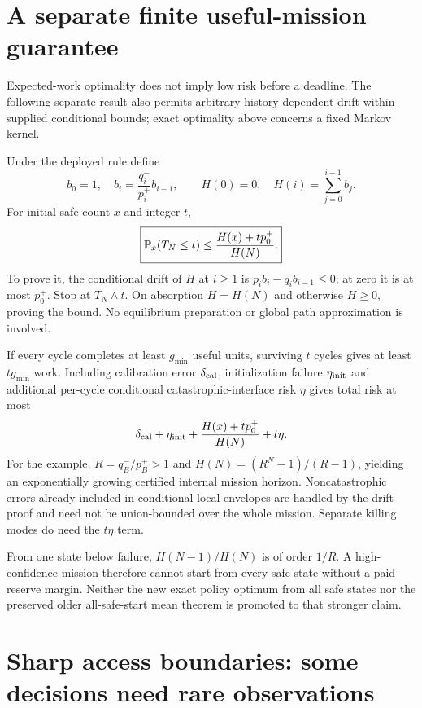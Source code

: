 \documentclass[10pt,a4paper]{article}
\begin{document}
\section{A separate finite useful-mission guarantee}

Expected-work optimality does not imply low risk before a deadline. The following separate result also permits arbitrary history-dependent drift within supplied conditional bounds; exact optimality above concerns a fixed Markov kernel.

Under the deployed rule define
\begin{equation}
b_0=1,\quad b_i=\frac{q_i^-}{p_i^+}b_{i-1},\qquad
H(0)=0,\quad H(i)=\sum_{j=0}^{i-1}b_j .
\end{equation}
For initial safe count $x$ and integer $t$,
\begin{equation}
\boxed{\mathbb P_x(T_N\le t)\le\frac{H(x)+t p_0^+}{H(N)}.}
\label{eq:mission}
\end{equation}
To prove it, the conditional drift of $H$ at $i\ge1$ is
$p_i b_i-q_i b_{i-1}\le0$; at zero it is at most $p_0^+$. Stop at $T_N\wedge t$. On absorption $H=H(N)$ and otherwise $H\ge0$, proving the bound. No equilibrium preparation or global path approximation is involved.

If every cycle completes at least $g_{\min}$ useful units, surviving $t$ cycles gives at least $t g_{\min}$ work. Including calibration error $\delta_{\rm cal}$, initialization failure $\eta_{\rm init}$ and additional per-cycle conditional catastrophic-interface risk $\eta$ gives total risk at most
\begin{equation}
\delta_{\rm cal}+\eta_{\rm init}
+\frac{H(x)+t p_0^+}{H(N)}+t\eta .
\label{eq:physicalrisk}
\end{equation}
For the example, $R=q_B^-/p_B^+>1$ and
$H(N)=(R^N-1)/(R-1)$, yielding an exponentially growing certified internal mission horizon. Noncatastrophic errors already included in conditional local envelopes are handled by the drift proof and need not be union-bounded over the whole mission. Separate killing modes do need the $t\eta$ term.

From one state below failure, $H(N-1)/H(N)$ is of order $1/R$. A high-confidence mission therefore cannot start from every safe state without a paid reserve margin. Neither the new exact policy optimum from all safe states nor the preserved older all-safe-start mean theorem is promoted to that stronger claim.

\section{Sharp access boundaries: some decisions need rare observations}
\end{document}
